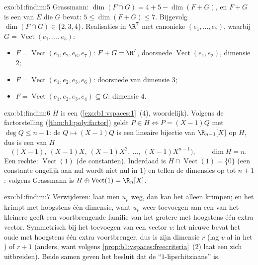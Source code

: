 \begin{solution}{exo:b1:findim:5}
Grassmann: $\dim(F \cap G) = 4 + 5 - \dim(F + G)$, en $F + G$ is een
 van $E$ die $G$ bevat: $5 \leq \dim(F+G) \leq 7$.
Bijgevolg $\dim(F \cap G) \in \{2, 3, 4\}$. Realisaties in $\R^7$
met canonieke  $(e_1, \dots, e_7)$, waarbij $G =
\operatorname{Vect}(e_1, \dots, e_5)$:
\begin{itemize}
  \item $F = \operatorname{Vect}(e_1, e_2, e_6, e_7)$: $F + G =
        \R^7$, doorsnede $\operatorname{Vect}(e_1, e_2)$, dimensie
        $2$;
  \item $F = \operatorname{Vect}(e_1, e_2, e_3, e_6)$: doorsnede van
        dimensie $3$;
  \item $F = \operatorname{Vect}(e_1, e_2, e_3, e_4) \subseteq G$:
        dimensie $4$.
\end{itemize}
\end{solution}

\begin{solution}{exo:b1:findim:6}
$H$ is een  (\cref{exo:b1:vspaces:1}~(4), woordelijk).
Volgens de factorstelling (\cref{thm:b1:poly:factor}) geldt $P \in H
\iff P = (X-1)Q$ met $\deg Q \leq n - 1$: de  $Q \mapsto
(X-1)Q$ is een lineaire bijectie van $\R_{n-1}[X]$ op $H$, dus is
een  van $H$
\[
\bigl((X-1),\ (X-1)X,\ (X-1)X^2,\ \dots,\ (X-1)X^{n-1}\bigr),
\qquad \dim H = n .
\]
Een  rechte: $\operatorname{Vect}(1)$ (de constanten).
Inderdaad is $H \cap \operatorname{Vect}(1) = \{0\}$ (een constante
ongelijk aan nul wordt niet nul in $1$) en tellen de dimensies op
tot $n + 1$: volgens Grassmann is $H \oplus \operatorname{Vect}(1) =
\R_n[X]$.
\end{solution}

\begin{solution}{exo:b1:findim:7}
Verwijderen: laat men $u_p$ weg, dan kan het  alleen
krimpen; en het krimpt met hoogstens één dimensie, want $u_p$ weer
toevoegen aan een  van het kleinere  geeft een
voortbrengende familie van het grotere met hoogstens één extra
vector. Symmetrisch bij het toevoegen van een vector $v$: het
nieuwe  bevat het oude met hoogstens één extra
voortbrenger, dus is zijn dimensie $r$ (lag $v$ al in het
) of $r + 1$ (anders, want volgens
\cref{prop:b1:vspaces:freecriteria}~(2) laat een  zich
uitbreiden). Beide  samen geven het besluit dat de 
``$1$-lipschitziaans'' is.
\end{solution}

